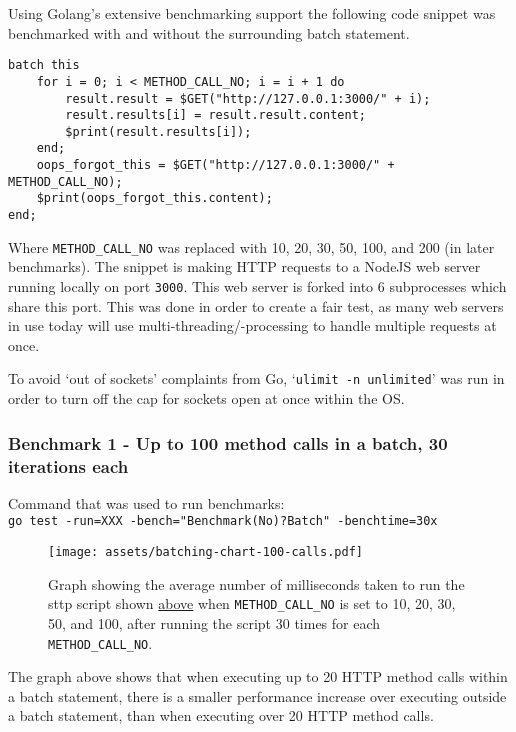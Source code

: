 Using Golang's extensive benchmarking support the following code snippet was benchmarked with and without the surrounding batch statement.

\begin{verbatim}
batch this
    for i = 0; i < METHOD_CALL_NO; i = i + 1 do
        result.result = $GET("http://127.0.0.1:3000/" + i);
        result.results[i] = result.result.content;
        $print(result.results[i]);
    end;
    oops_forgot_this = $GET("http://127.0.0.1:3000/" + METHOD_CALL_NO);
    $print(oops_forgot_this.content);
end;
\end{verbatim}

Where \verb|METHOD_CALL_NO| was replaced with 10, 20, 30, 50, 100, and 200 (in later benchmarks). The snippet is making HTTP requests to a NodeJS web server running locally on port \verb|3000|. This web server is forked into 6 subprocesses which share this port. This was done in order to create a fair test, as many web servers in use today will use multi-threading/-processing to handle multiple requests at once.

To avoid `out of sockets' complaints from Go, `\verb|ulimit -n unlimited|' was run in order to turn off the cap for sockets open at once within the OS.

\subsubsection{Benchmark 1 - Up to 100 method calls in a batch, 30 iterations each}
\label{sec:batching-benchmark-1}

\begin{center}
    Command that was used to run benchmarks:\\[0.5em]
    \verb|go test -run=XXX -bench="Benchmark(No)?Batch" -benchtime=30x|
\end{center}

\begin{figure}[H]
    \centering
    \texttt{[image: assets/batching-chart-100-calls.pdf]}
    \cprotect\caption{Graph showing the average number of milliseconds taken to run the sttp script shown \hyperref[sec:batching-performance]{above} when \verb|METHOD_CALL_NO| is set to 10, 20, 30, 50, and 100, after running the script 30 times for each \verb|METHOD_CALL_NO|.}
\end{figure}

The graph above shows that when executing up to 20 HTTP method calls within a batch statement, there is a smaller performance increase over executing outside a batch statement, than when executing over 20 HTTP method calls.

